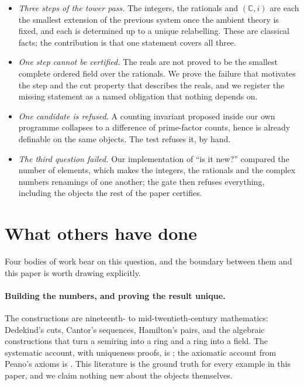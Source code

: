 \documentclass[aps,prd,preprint,superscriptaddress,amsmath,amssymb]{revtex4-2}
\begin{document}
\begin{itemize}
\item \emph{Three steps of the tower pass.}  The integers, the rationals and
      $(\mathbb{C},i)$ are each the smallest extension of the previous system
      once the ambient theory is fixed, and each is determined up to a unique
      relabelling.  These are classical facts; the contribution is that one
      statement covers all three.
\item \emph{One step cannot be certified.}  The reals are not proved to be the
      smallest complete ordered field over the rationals.  We prove the failure
      that motivates the step and the cut property that describes the reals, and
      we register the missing statement as a named obligation that nothing
      depends on.
\item \emph{One candidate is refused.}  A counting invariant proposed inside our
      own programme collapses to a difference of prime-factor counts, hence is
      already definable on the same objects.  The test refuses it, by hand.
\item \emph{The third question failed.}  Our implementation of ``is it new?''
      compared the number of elements, which makes the integers, the rationals
      and the complex numbers renamings of one another; the gate then refuses
      everything, including the objects the rest of the paper certifies.
\end{itemize}

\section{What others have done}
\label{sec:related}

Four bodies of work bear on this question, and the boundary between them and this
paper is worth drawing explicitly.

\paragraph{Building the numbers, and proving the result unique.}
The constructions are nineteenth- to mid-twentieth-century mathematics:
Dedekind's cuts, Cantor's sequences, Hamilton's pairs, and the algebraic
constructions that turn a semiring into a ring and a ring into a field.  The
systematic account, with uniqueness proofs, is \cite{ebb}; the axiomatic account
from Peano's axioms is \cite{landau}.  This literature is the ground truth for
every example in this paper, and we claim nothing new about the objects
themselves.
\end{document}
